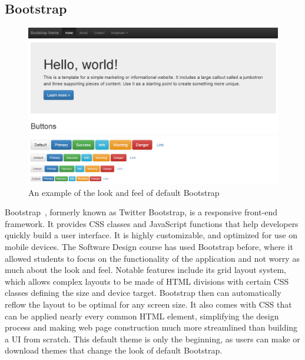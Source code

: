 \documentclass[12pt]{article}
\begin{document}
\subsection{Bootstrap}\label{sec:bootstrap}
\begin{figure}[h!]
\includegraphics[width=\linewidth]{img/bootstrap.png}
\caption{An example of the look and feel of default Bootstrap}
\end{figure}
Bootstrap~\cite{Bootstrap}, formerly known as Twitter Bootstrap, is a responsive front-end framework. It provides CSS classes and JavaScript functions that help developers quickly build a user interface. It is highly customizable, and optimized for use on mobile devices. The Software Design course has used Bootstrap before, where it allowed students to focus on the functionality of the application and not worry as much about the look and feel. Notable features include its grid layout system, which allows complex layouts to be made of HTML divisions with certain CSS classes defining the size and device target. Bootstrap then can automatically reflow the layout to be optimal for any screen size. It also comes with CSS that can be applied nearly every common HTML element, simplifying the design process and making web page construction much more streamlined than building a UI from scratch. This default theme is only the beginning, as users can make or download themes that change the look of default Bootstrap.
\end{document}
